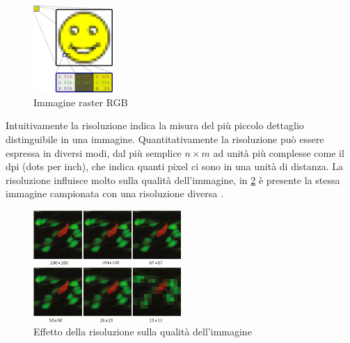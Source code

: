\begin{figure}[ht]
\end{figure}

\begin{figure}[ht]
    \centering
    \includegraphics[width=0.27\textwidth]{frame/Rgb-raster-image.pdf}
    \caption{Immagine raster RGB}
    \label{fig:rgb-raster-image}
\end{figure}

Intuitivamente la risoluzione indica la  misura del più piccolo dettaglio distinguibile in una immagine. Quantitativamente la risoluzione può essere espressa in diversi modi, dal più semplice \(n\times m\) ad unità più complesse come il dpi (dots per inch), che indica quanti pixel ci sono in una unità di distanza. La risoluzione influisce molto sulla qualità dell'immagine, in \cref{fig:resolution-on-image-quality} è presente la stessa immagine campionata con una risoluzione diversa \cite{gonzalez_dip} \cite{spaepen_resolution}.

\begin{figure}[ht]
    \centering
    \includegraphics[width=0.5\textwidth]{frame/resolution-on-image-quality.png}
    \caption{Effetto della risoluzione sulla qualità dell'immagine}
    \label{fig:resolution-on-image-quality}
\end{figure}


